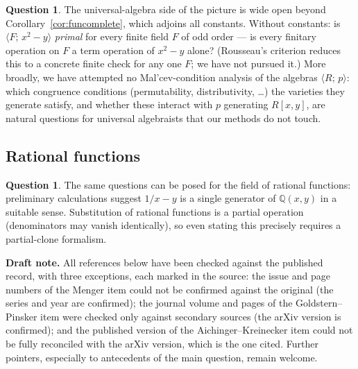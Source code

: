 \documentclass[11pt]{article}
\theoremstyle{definition}
\newtheorem{question}[theorem]{Question}
\theoremstyle{remark}
\newcommand{\Q}{\mathbb{Q}}
\begin{document}
\begin{question}\label{q:ua}
The universal-algebra side of the picture is wide open beyond
Corollary~\ref{cor:funcomplete}, which adjoins all constants.
Without constants: is $\langle F;\, x^2 - y \rangle$ \emph{primal}
for every finite field $F$ of odd order --- is every finitary
operation on $F$ a term operation of $x^2 - y$ alone?  (Rousseau's
criterion \cite{Rousseau} reduces this to a concrete finite check for
any one $F$; we have not pursued it.)  More broadly, we have
attempted no Mal'cev-condition analysis of the algebras
$\langle R;\, p \rangle$: which congruence conditions
(permutability, distributivity, \dots) the varieties they generate
satisfy, and whether these interact with $p$ generating $R[x,y]$, are
natural questions for universal algebraists that our methods do not
touch.
\end{question}

\subsection*{Rational functions}

\begin{question}
The same questions can be posed for the field of rational functions:
preliminary calculations suggest $1/x - y$ is a single generator of
$\Q(x,y)$ in a suitable sense.  Substitution of rational functions is
a partial operation (denominators may vanish identically), so even
stating this precisely requires a partial-clone formalism.
\end{question}

\medskip
\noindent\textbf{Draft note.}  All references below have been checked
against the published record, with three exceptions, each marked in
the source: the issue and page numbers of the Menger item could not
be confirmed against the original (the series and year are
confirmed); the journal volume and pages of the Goldstern--Pinsker
item were checked only against secondary sources (the arXiv version
is confirmed); and the published version of the Aichinger--Kreinecker
item could not be fully reconciled with the arXiv version, which is
the one cited.  Further pointers, especially to antecedents of the
main question, remain welcome.
\end{document}
